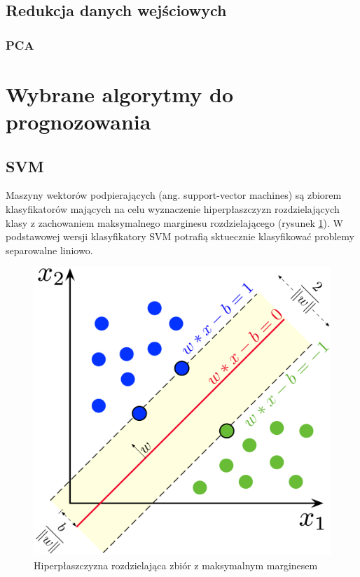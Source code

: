 \documentclass[a4paper, twoside, 11pt, openright]{article}
\begin{document}
\subsection{Redukcja danych wejściowych}

\subsubsection{PCA}



\newpage

\section{Wybrane algorytmy do prognozowania}


\subsection{SVM \cite{svm}}

Maszyny wektorów podpierających (ang. support-vector machines) są zbiorem klasyfikatorów mających na celu wyznaczenie hiperpłaszczyzn rozdzielających klasy z zachowaniem maksymalnego marginesu rozdzielającego (rysunek \ref{wiki_svm}). W podstawowej wersji klasyfikatory SVM potrafią sktuecznie klasyfikować problemy separowalne liniowo.


\begin{figure}[H]
\centering \includegraphics[scale=0.9]{img/svm.png}
\caption{Hiperpłaszczyzna rozdzielająca zbiór z maksymalnym marginesem \cite{wikisvm}}
\label{wiki_svm}
\end{figure}
\end{document}
